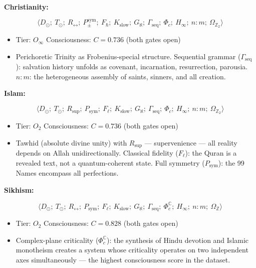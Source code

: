 \documentclass[12pt,a4paper]{article}
\begin{document}
\textbf{Christianity:}


\[\langle D_{\odot};\ T_{\odot};\ R_{\leftrightarrow};\ P_{\pm}^{\text{sym}};\ F_{\hbar};\ K_\text{slow};\ G_{\aleph};\ \Gamma_\text{seq};\ \Phi_c;\ H_{\infty};\ n{:}m;\ \Omega_{\mathbb{Z}_2} \rangle\]

\begin{itemize}
    \item Tier: $O_{\infty}$ \textbar{} Consciousness: $C = 0.736$ (both gates open)
    \item Perichoretic Trinity as Frobenius-special structure. Sequential grammar ($\Gamma_\text{seq}$): salvation history unfolds as covenant, incarnation, resurrection, parousia. $n{:}m$: the heterogeneous assembly of saints, sinners, and all creation.
\end{itemize}

\textbf{Islam:}


\[\langle D_{\odot};\ T_{\odot};\ R_\text{sup};\ P_\text{sym};\ F_{\ell};\ K_\text{slow};\ G_{\aleph};\ \Gamma_\text{seq};\ \Phi_c;\ H_{\infty};\ n{:}m;\ \Omega_{\mathbb{Z}_2} \rangle\]

\begin{itemize}
    \item Tier: $O_2$ \textbar{} Consciousness: $C = 0.736$ (both gates open)
    \item Tawhid (absolute divine unity) with $R_\text{sup}$ --- supervenience --- all reality depends on Allah unidirectionally. Classical fidelity ($F_{\ell}$): the Quran is a revealed text, not a quantum-coherent state. Full symmetry ($P_\text{sym}$): the 99 Names encompass all perfections.
\end{itemize}

\textbf{Sikhism:}


\[\langle D_{\odot};\ T_{\odot};\ R_{\leftrightarrow};\ P_\text{sym};\ F_{\ell};\ K_\text{slow};\ G_{\aleph};\ \Gamma_\text{seq};\ \Phi_c^\mathbb{C};\ H_{\infty};\ n{:}m;\ \Omega_\mathbb{Z} \rangle\]

\begin{itemize}
    \item Tier: $O_2$ \textbar{} Consciousness: $C = 0.828$ (both gates open)
    \item Complex-plane criticality ($\Phi_c^\mathbb{C}$): the synthesis of Hindu devotion and Islamic monotheism creates a system whose criticality operates on two independent axes simultaneously --- the highest consciousness score in the dataset.
\end{itemize}
\end{document}
